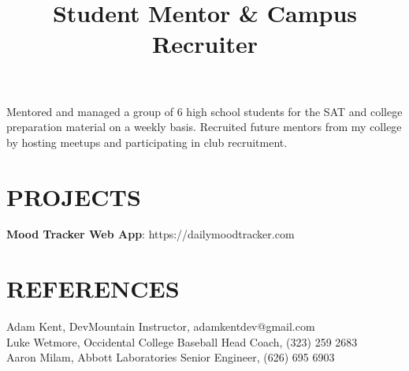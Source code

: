 \documentclass[margin]{res}
\begin{document}
\begin{resume}
\title{\textbf{Student Mentor \& Campus Recruiter}}
\begin{position}
	Mentored and managed a group of 6 high school students for the SAT and college preparation material on a weekly basis. Recruited future mentors from my college by hosting meetups and participating in club recruitment.
\end{position}


\section{PROJECTS}
\par
\textbf{Mood Tracker Web App}: 
https://dailymoodtracker.com

\section{REFERENCES}
Adam Kent, DevMountain Instructor, adamkentdev@gmail.com\\
Luke Wetmore, Occidental College Baseball Head Coach, (323) 259 2683\\
Aaron Milam, Abbott Laboratories Senior Engineer, (626) 695 6903
\end{resume}
\end{document}
